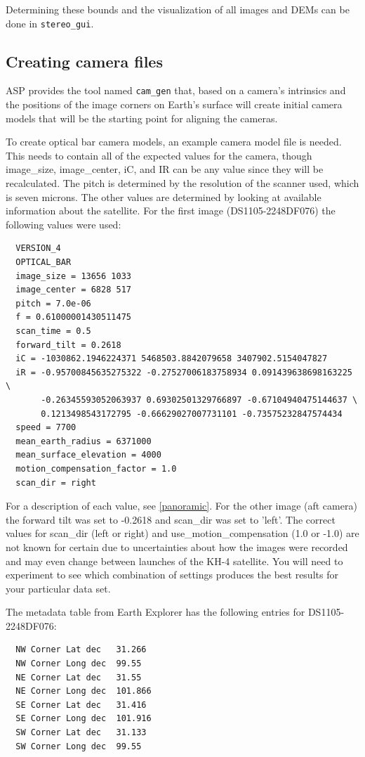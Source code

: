 Determining these bounds and the visualization of all images and DEMs
can be done in \texttt{stereo\_gui}.

\subsection{Creating camera files}

ASP provides the tool named \texttt{cam\_gen} that, based on a camera's intrinsics
and the positions of the image corners on Earth's surface will
create initial camera models that will be the starting point for aligning the cameras.

To create optical bar camera models, an example camera model file is needed.
This needs to contain all of the expected values for the camera, though
image\_size, image\_center, iC, and IR can be any value since they will be recalculated.
The pitch is determined by the resolution of the scanner used, which is seven microns.
The other values are determined by looking at available information about the satellite.
For the first image (DS1105-2248DF076) the following values were used:

\begin{verbatim}
  VERSION_4
  OPTICAL_BAR
  image_size = 13656 1033
  image_center = 6828 517
  pitch = 7.0e-06
  f = 0.61000001430511475
  scan_time = 0.5
  forward_tilt = 0.2618
  iC = -1030862.1946224371 5468503.8842079658 3407902.5154047827
  iR = -0.95700845635275322 -0.27527006183758934 0.091439638698163225 \
       -0.26345593052063937 0.69302501329766897 -0.67104940475144637 \
       0.1213498543172795 -0.66629027007731101 -0.73575232847574434
  speed = 7700
  mean_earth_radius = 6371000
  mean_surface_elevation = 4000
  motion_compensation_factor = 1.0
  scan_dir = right
\end{verbatim}

For a description of each value, see \ref{panoramic}.
For the other image (aft camera) the forward tilt was set to -0.2618 and scan\_dir was set to 'left'.
The correct values for scan\_dir (left or right) and use\_motion\_compensation (1.0 or -1.0) are not
known for certain due to uncertainties about how the images were recorded and may even change
between launches of the KH-4 satellite.  You will need to experiment to see which combination of settings
produces the best results for your particular data set.

The metadata table from Earth Explorer has the following entries
for DS1105-2248DF076:
\begin{verbatim}
  NW Corner Lat dec   31.266
  NW Corner Long dec  99.55
  NE Corner Lat dec   31.55
  NE Corner Long dec  101.866
  SE Corner Lat dec   31.416
  SE Corner Long dec  101.916
  SW Corner Lat dec   31.133
  SW Corner Long dec  99.55
\end{verbatim}

